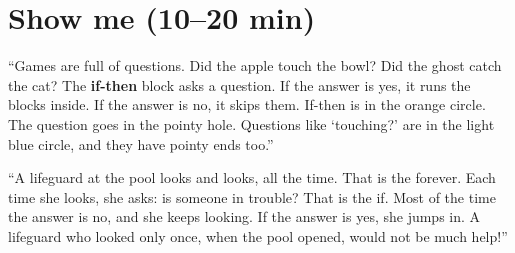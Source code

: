\section{Show me (10--20 min)}
\begin{teacherscript}
\enquote{Games are full of questions. Did the apple touch the bowl? Did the ghost catch the cat? The \textbf{if-then} block asks a question. If the answer is yes, it runs the blocks inside. If the answer is no, it skips them. If-then is in the orange  circle. The question goes in the pointy hole. Questions like \enquote{touching?} are in the light blue  circle, and they have pointy ends too.}
\end{teacherscript}

\begin{analogy}
\enquote{A lifeguard at the pool looks and looks, all the time. That is the forever. Each time she looks, she asks: is someone in trouble? That is the if. Most of the time the answer is no, and she keeps looking. If the answer is yes, she jumps in. A lifeguard who looked only once, when the pool opened, would not be much help!}
\end{analogy}

